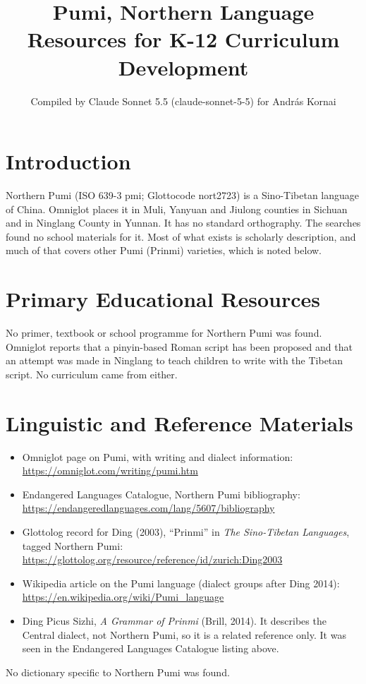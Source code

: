 \documentclass[12pt]{article}
\title{Pumi, Northern Language Resources for K-12 Curriculum Development}
\author{Compiled by Claude Sonnet 5.5 (claude-sonnet-5-5) for Andr\'as Kornai}
\date{}
\begin{document}
\maketitle

\section{Introduction}
Northern Pumi (ISO 639-3 pmi; Glottocode nort2723) is a Sino-Tibetan language of China. Omniglot places it in Muli, Yanyuan and Jiulong counties in Sichuan and in Ninglang County in Yunnan. It has no standard orthography. The searches found no school materials for it. Most of what exists is scholarly description, and much of that covers other Pumi (Prinmi) varieties, which is noted below.

\section{Primary Educational Resources}
No primer, textbook or school programme for Northern Pumi was found. Omniglot reports that a pinyin-based Roman script has been proposed and that an attempt was made in Ninglang to teach children to write with the Tibetan script. No curriculum came from either.

\section{Linguistic and Reference Materials}
\begin{itemize}
\item Omniglot page on Pumi, with writing and dialect information: \url{https://omniglot.com/writing/pumi.htm}
\item Endangered Languages Catalogue, Northern Pumi bibliography: \url{https://endangeredlanguages.com/lang/5607/bibliography}
\item Glottolog record for Ding (2003), ``Prinmi'' in \emph{The Sino-Tibetan Languages}, tagged Northern Pumi: \url{https://glottolog.org/resource/reference/id/zurich:Ding2003}
\item Wikipedia article on the Pumi language (dialect groups after Ding 2014): \url{https://en.wikipedia.org/wiki/Pumi_language}
\item Ding Picus Sizhi, \emph{A Grammar of Prinmi} (Brill, 2014). It describes the Central dialect, not Northern Pumi, so it is a related reference only. It was seen in the Endangered Languages Catalogue listing above.
\end{itemize}
No dictionary specific to Northern Pumi was found.
\end{document}
